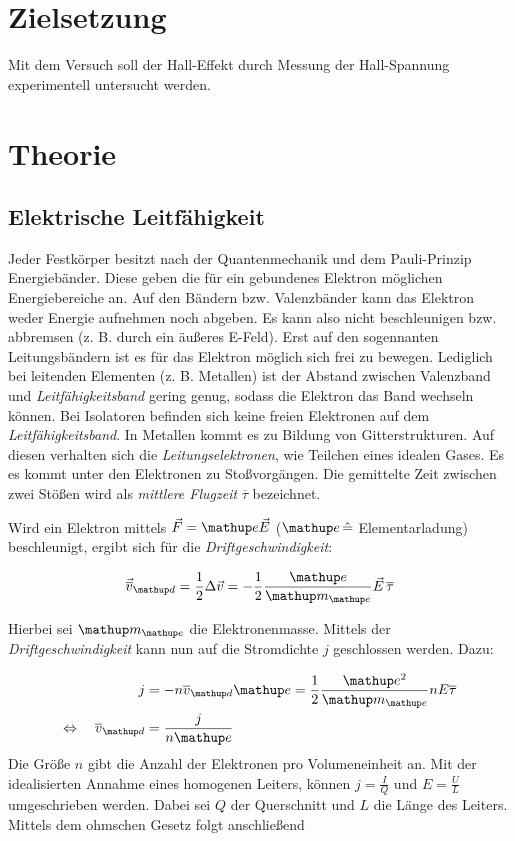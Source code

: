 \setcounter{page}{1}
\section*{Zielsetzung}
Mit dem Versuch soll der Hall-Effekt durch Messung der
Hall-Spannung experimentell untersucht werden. %

\section{Theorie}

\subsection{Elektrische Leitfähigkeit}
Jeder Festkörper besitzt nach der Quantenmechanik und dem Pauli-Prinzip
Energiebänder.
Diese geben die für ein gebundenes Elektron möglichen Energiebereiche an. Auf den Bändern bzw. Valenzbänder kann das Elektron weder
Energie aufnehmen noch abgeben. 
Es kann also nicht beschleunigen bzw. abbremsen (z. B. durch ein äußeres E-Feld).
Erst auf den sogennanten Leitungsbändern ist es für das Elektron möglich 
sich frei zu bewegen.
Lediglich bei leitenden Elementen (z. B. Metallen) ist der Abstand zwischen Valenzband und \emph{Leitfähigkeitsband} gering genug, sodass die Elektron das Band
wechseln können. 
Bei Isolatoren befinden sich keine freien Elektronen auf dem \emph{Leitfähigkeitsband}.
In Metallen kommt es zu Bildung von Gitterstrukturen.
Auf diesen verhalten sich die \emph{Leitungselektronen}, wie Teilchen eines idealen Gases.
Es es kommt unter den Elektronen zu Stoßvorgängen.
Die gemittelte Zeit zwischen zwei Stößen wird als \emph{mittlere Flugzeit} $\overline{\tau}$ bezeichnet.

Wird ein Elektron mittels $\vec{F}=\map{e}\vec{E}$ ($\map{e}\, \hat{=}$ Elementarladung) beschleunigt, %
ergibt sich für die \emph{Driftgeschwindigkeit}: %

\begin{equation}
\label{eq:drift_v}
\vec{\overline{v}}\ua{d}=\frac{1}{2}\Delta\vec{v}=-\frac{1}{2}\frac{\map{e}}{\map{m}\ua{e}}\vec{E}\,\overline{\tau}
\end{equation}

Hierbei sei $\map{m}\ua{e}$ die Elektronenmasse.
Mittels der \emph{Driftgeschwindigkeit} kann nun auf die Stromdichte $j$ geschlossen werden. Dazu:

\begin{align}
j&=-n\overline{v}\ua{d}\map{e}=\frac{1}{2}\frac{\map{e^2}}{\map{m}\ua{e}}n E\overline{\tau}\notag \\
\Leftrightarrow \quad \overline{v}\ua{d}&=\frac{j}{n\map{e}}\label{eq:stromdicht}
\end{align}
Die Größe $n$ gibt die Anzahl der Elektronen pro Volumeneinheit an.
Mit der idealisierten Annahme eines homogenen Leiters, können %
$j=\frac{I}{Q}$ und $E=\frac{U}{L}$ umgeschrieben werden.
Dabei sei $Q$ der Querschnitt und $L$ die Länge des Leiters.
Mittels dem ohmschen Gesetz folgt anschließend

